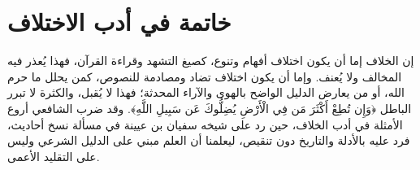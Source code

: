 \section{خاتمة في أدب الاختلاف}
إن الخلاف إما أن يكون اختلاف أفهام وتنوع، كصيغ التشهد وقراءة القرآن، فهذا يُعذر فيه المخالف ولا يُعنف. وإما أن يكون اختلاف تضاد ومصادمة للنصوص، كمن يحلل ما حرم الله، أو من يعارض الدليل الواضح بالهوى والآراء المحدثة؛ فهذا لا يُقبل، والكثرة لا تبرر الباطل ﴿وَإِن تُطِعْ أَكْثَرَ مَن فِي الْأَرْضِ يُضِلُّوكَ عَن سَبِيلِ اللَّهِ﴾. 
وقد ضرب الشافعي أروع الأمثلة في أدب الخلاف، حين رد على شيخه سفيان بن عيينة في مسألة نسخ أحاديث، فرد عليه بالأدلة والتاريخ دون تنقيص، ليعلمنا أن العلم مبني على الدليل الشرعي وليس على التقليد الأعمى.